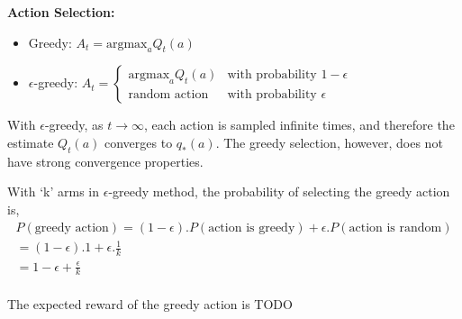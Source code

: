 \textbf{Action Selection:}
\begin{itemize}
    \item  Greedy: $ A_t = \text{argmax}_a Q_t(a) $
    \item  $\epsilon$-greedy: $ A_t = \begin{cases}
        \text{argmax}_a Q_t(a) & \text{with probability } 1 - \epsilon \\
        \text{random action} & \text{with probability } \epsilon
    \end{cases} $
\end{itemize}


With $\epsilon$-greedy, as $t \to \infty$, each action is sampled infinite times, and therefore the estimate $Q_t(a)$ converges to $q_*(a)$. 
The greedy selection, however, does not have strong convergence properties.

With `k' arms in  $\epsilon$-greedy method, the probability of selecting the greedy action is,
\begin{equation}
    \begin{split}
        P(\text{greedy action}) = (1 - \epsilon).P(\text{action is greedy}) + \epsilon.P(\text{action is random}) \\
        = (1 - \epsilon).1 + \epsilon.\frac{1}{k} \\
        = 1 - \epsilon + \frac{\epsilon}{k} \\
        \label{eq:epsilon-greedy}
    \end{split}
\end{equation}

The expected reward of the greedy action is TODO




